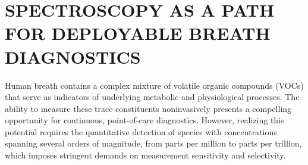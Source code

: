 \documentclass[12pt]{report}
\begin{document}
%	
%	

	
	\renewcommand{\tamumanuscripttitle}{ Toward a Compact Optical Breath Diagnostic Platform: Wavelength and Concentration Retrieval in Cavity-Enhanced Spectrometers with Reduced Calibration Dependence}
	
	\renewcommand{\tamupapertype}{Dissertation}
	
	\renewcommand{\tamufullname}{James Robert Bounds}
	
	\renewcommand{\tamudegree}{DOCTOR OF PHILOSOPHY}
	\renewcommand{\tamuchairone}{Alexei V. Sokolov}
	\renewcommand{\tamumemberone}{Albert L. Ford Jr.}
	\renewcommand{\tamumembertwo}{Siu A. Chin}
	\renewcommand{\tamumemberthree}{Janet F. Bluemel}
	\renewcommand{\tamudepthead}{Grigory V. Rogachev}
	
	
	\renewcommand{\tamugradmonth}{August}
	\renewcommand{\tamugradyear}{2026}
	\renewcommand{\tamudepartment}{Physics}
	
	
	
	
	
	
	
	
	
	
	\setcounter{page}{1}
	
	
	\chapter{SPECTROSCOPY AS A PATH FOR DEPLOYABLE BREATH DIAGNOSTICS}
	
	Human breath contains a complex mixture of volatile organic compounds (VOCs) that serve as indicators of underlying metabolic and physiological processes. The ability to measure these trace constituents noninvasively presents a compelling opportunity for continuous, point-of-care diagnostics. However, realizing this potential requires the quantitative detection of species with concentrations spanning several orders of magnitude, from parts per million to parts per trillion, which imposes stringent demands on measurement sensitivity and selectivity.
	
\end{document}
